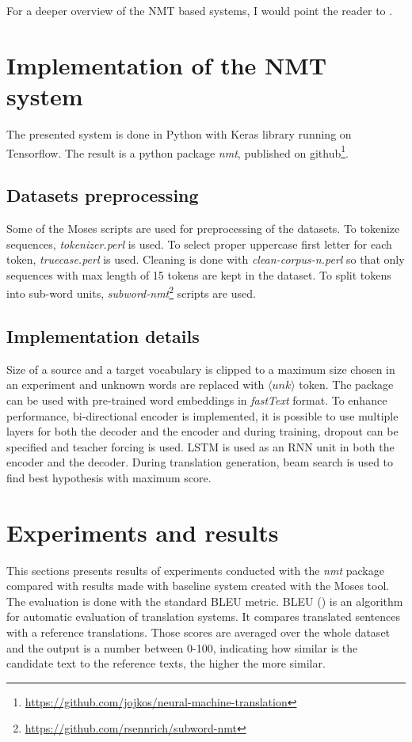 \documentclass{ExcelAtFIT}
\begin{document}
For a deeper overview of the NMT based systems, I would point the reader to \cite{nmtTutorial}.

\section{Implementation of the NMT system}
The presented system is done in Python with Keras library running on Tensorflow. The result is a python package \emph{nmt}, published on github\footnote{\url{https://github.com/jojkos/neural-machine-translation}}.

\subsection{Datasets preprocessing}
Some of the Moses scripts are used for preprocessing of the datasets. To tokenize sequences, \emph{tokenizer.perl} is used. To select proper uppercase first letter for each token, \emph{truecase.perl} is used. Cleaning is done with \emph{clean-corpus-n.perl} so that only sequences with max length of 15 tokens are kept in the dataset. To split tokens into sub-word units, \emph{subword-nmt}\footnote{\url{https://github.com/rsennrich/subword-nmt}} scripts are used.

\subsection{Implementation details}
Size of a source and a target vocabulary is clipped to a maximum size chosen in an experiment and unknown words are replaced with $\langle unk \rangle$ token. The package can be used with pre-trained word embeddings in \emph{fastText} format. To enhance performance, bi-directional encoder is implemented, it is possible to use multiple layers for both the decoder and the encoder and during training, dropout can be specified and teacher forcing is used. LSTM is used as an RNN unit in both the encoder and the decoder. During translation generation, beam search is used to find best hypothesis with maximum score.


\section{Experiments and results}
This sections presents results of experiments conducted with the \emph{nmt} package compared with results made with baseline system created with the Moses tool. The evaluation is done with the standard BLEU metric. BLEU (\cite{BLEU}) is an algorithm for automatic evaluation of translation systems. It compares translated sentences with a reference translations. Those scores are averaged over the whole dataset and the output is a number between 0-100, indicating how similar is the candidate text to the reference texts, the higher the more similar.
\end{document}
